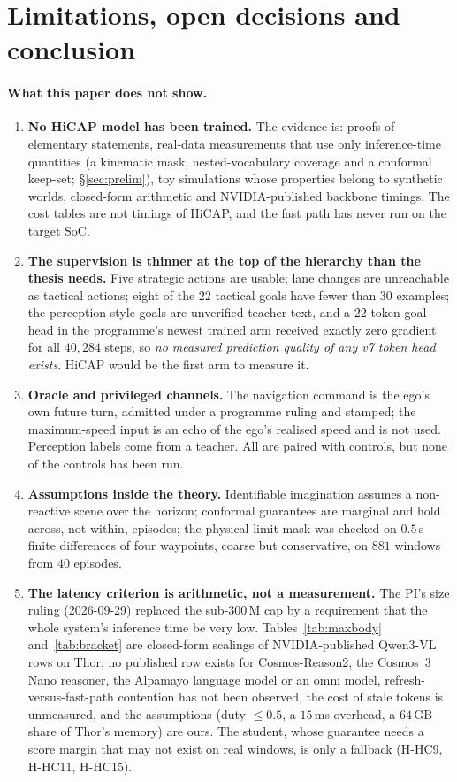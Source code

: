 \section{Limitations, open decisions and conclusion}\label{sec:limits}
\paragraph{What this paper does not show.}
\begin{enumerate}
\item \textbf{No HiCAP model has been trained.} The evidence is: proofs of elementary statements, real-data measurements that use only inference-time quantities (a kinematic mask, nested-vocabulary coverage and a conformal keep-set; \S\ref{sec:prelim}), toy simulations whose properties belong to synthetic worlds, closed-form arithmetic and NVIDIA-published backbone timings. The cost tables are not timings of HiCAP, and the fast path has never run on the target SoC.
\item \textbf{The supervision is thinner at the top of the hierarchy than the thesis needs.} Five strategic actions are usable; lane changes are unreachable as tactical actions; eight of the $22$ tactical goals have fewer than $30$ examples; the perception-style goals are unverified teacher text, and a $22$-token goal head in the programme's newest trained arm received exactly zero gradient for all $40{,}284$ steps, so \emph{no measured prediction quality of any v7 token head exists}\evI. HiCAP would be the first arm to measure it.
\item \textbf{Oracle and privileged channels.} The navigation command is the ego's own future turn, admitted under a programme ruling and stamped; the maximum-speed input is an echo of the ego's realised speed and is not used. Perception labels come from a teacher. All are paired with controls, but none of the controls has been run.
\item \textbf{Assumptions inside the theory.} Identifiable imagination assumes a non-reactive scene over the horizon; conformal guarantees are marginal and hold across, not within, episodes; the physical-limit mask was checked on $0.5$\,s finite differences of four waypoints, coarse but conservative, on $881$ windows from $40$ episodes.
\item \textbf{The latency criterion is arithmetic, not a measurement.} The PI's size ruling (2026-09-29) replaced the sub-300\,M cap by a requirement that the whole system's inference time be very low. Tables~\ref{tab:maxbody} and~\ref{tab:bracket} are closed-form scalings of NVIDIA-published Qwen3-VL rows on Thor; no published row exists for Cosmos-Reason2, the Cosmos~3 Nano reasoner, the Alpamayo language model or an omni model, refresh-versus-fast-path contention has not been observed, the cost of stale tokens is unmeasured, and the assumptions (duty $\le0.5$, a $15$\,ms overhead, a $64$\,GB share of Thor's memory) are ours. The student, whose guarantee needs a score margin that may not exist on real windows, is only a fallback (H-HC9, H-HC11, H-HC15).

\end{enumerate}
